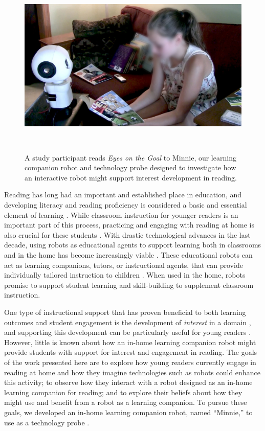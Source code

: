 \documentclass{sigchi}
\begin{document}
\begin{figure}[t]
	\centering
	\includegraphics[width=1\columnwidth]{figures/chi17-michaelis-figures-teaser2.jpg}
	\caption{A study participant reads \textit{Eyes on the Goal} to Minnie, our learning companion robot and technology probe designed to investigate how an interactive robot might support interest development in reading.}~\label{fig:teaser}
	\vspace{-8pt}
\end{figure}

Reading has long had an important and established place in education, and developing literacy and reading proficiency is considered a basic and essential element of learning \cite{McCormick:1994,Freire:1983}. While classroom instruction for younger readers is an important part of this process, practicing and engaging with reading at home is also crucial for these students \cite{Baker:1997}. With drastic technological advances in the last decade, using robots as educational agents to support learning both in classrooms and in the home has become increasingly viable \cite{Benitti:2012}. These educational robots can act as learning companions, tutors, or instructional agents, that can provide individually tailored instruction to children \cite{Miller:2008}. When used in the home, robots promise to support student learning and skill-building to supplement classroom instruction.

One type of instructional support that has proven beneficial to both learning outcomes and student engagement is the development of \textit{interest} in a domain \cite{Hidi:2006}, and supporting this development can be particularly useful for young readers \cite{Jones:2011}. However, little is known about how an in-home learning companion robot might provide students with support for interest and engagement in reading. The goals of the work presented here are to explore how young readers currently engage in reading at home and how they imagine technologies such as robots could enhance this activity; to observe how they interact with a robot designed as an in-home learning companion for reading; and to explore their beliefs about how they might use and benefit from a robot as a learning companion. To pursue these goals, we developed an in-home learning companion robot, named ``Minnie,'' to use as a technology probe \cite{Hutchinson:2003}.
\end{document}
